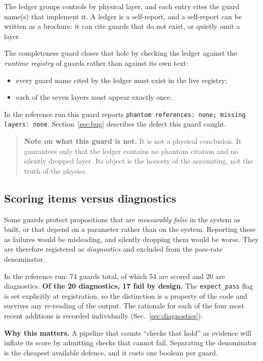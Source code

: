 \documentclass[11pt,a4paper]{article}
\newcommand{\code}[1]{\texttt{\small #1}}
\begin{document}
The ledger groups controls by physical layer, and each entry cites the guard name(s)
that implement it. A ledger is a self-report, and a self-report can be written as a
brochure: it can cite guards that do not exist, or quietly omit a layer.

The completeness guard closes that hole by checking the ledger against the
\emph{runtime registry} of guards rather than against its own text:

\begin{itemize}[leftmargin=1.4em,itemsep=2pt]
  \item every guard name cited by the ledger must exist in the live registry;
  \item each of the seven layers must appear exactly once.
\end{itemize}

\noindent In the reference run this guard reports \code{phantom references: none;
missing layers: none}. Section~\ref{sec:bug} describes the defect this guard caught.

\begin{quote}
\textbf{Note on what this guard is not.} It is not a physical conclusion. It
guarantees only that the ledger contains no phantom citation and no silently
dropped layer. Its object is the honesty of the accounting, not the truth of the
physics.
\end{quote}

\subsection{Scoring items versus diagnostics}
\label{sec:split}

Some guards protect propositions that are \emph{measurably false} in the system as
built, or that depend on a parameter rather than on the system. Reporting these as
failures would be misleading, and silently dropping them would be worse. They are
therefore registered as \emph{diagnostics} and excluded from the pass-rate
denominator.

In the reference run: 74 guards total, of which 54 are scored and 20 are
diagnostics. \textbf{Of the 20 diagnostics, 17 fail by design.} The
\code{expect\_pass} flag is set explicitly at registration, so the distinction is a
property of the code and survives any re-reading of the output. The rationale for
each of the four most recent additions is recorded individually
(Sec.~\ref{sec:diagnostics}).

\medskip
\noindent\textbf{Why this matters.} A pipeline that counts ``checks that hold'' as
evidence will inflate its score by admitting checks that cannot fail. Separating
the denominator is the cheapest available defence, and it costs one boolean per
guard.
\end{document}
